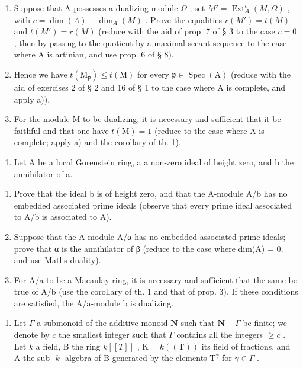 \begin{enumerate}
\def\labelenumi{\alph{enumi})}
\item
  Suppose that A possesses a dualizing module \(\Omega\) ; set \(M' = \operatorname{Ext}_A^c(M, \Omega)\) , with \(c = \dim(A) - \dim_A(M)\) . Prove the equalities \(r(M') = t(M)\) and \(t(M') = r(M)\) (reduce with the aid of prop. 7 of § 3 to the case \(c = 0\) , then by passing to the quotient by a maximal secant sequence to the case where A is artinian, and use prop. 6 of § 8).
\item
  Hence we have \(t(\mathrm{M}_{\mathfrak{p}}) \leqslant t(\mathrm{M})\) for every \(\mathfrak{p} \in \operatorname{Spec}(\mathrm{A})\) (reduce with the aid of exercises 2 of § 2 and 16 of § 1 to the case where A is complete, and apply a)).
\item
  For the module M to be dualizing, it is necessary and sufficient that it be faithful and that one have \(t(\mathrm{M}) = 1\) (reduce to the case where A is complete; apply a) and the corollary of th. 1).
\end{enumerate}

\begin{enumerate}
\def\labelenumi{\arabic{enumi})}
\setcounter{enumi}{7}
\tightlist
\item
  Let A be a local Gorenstein ring, a a non-zero ideal of height zero, and b the annihilator of a.
\end{enumerate}

\begin{enumerate}
\def\labelenumi{\alph{enumi})}
\item
  Prove that the ideal b is of height zero, and that the A-module A/b has no embedded associated prime ideals (observe that every prime ideal associated to A/b is associated to A).
\item
  Suppose that the A-module A/α has no embedded associated prime ideals; prove that α is the annihilator of β (reduce to the case where dim(A) = 0, and use Matlis duality).
\item
  For A/a to be a Macaulay ring, it is necessary and sufficient that the same be true of A/b (use the corollary of th. 1 and that of prop. 3). If these conditions are satisfied, the A/a-module b is dualizing.
\end{enumerate}

\begin{enumerate}
\def\labelenumi{\arabic{enumi})}
\setcounter{enumi}{8}
\tightlist
\item
  Let \(\Gamma\) a submonoid of the additive monoid \(\mathbf{N}\) such that \(\mathbf{N} - \Gamma\) be finite; we denote by \(c\) the smallest integer such that \(\Gamma\) contains all the integers \(\geqslant c\) . Let \(k\) a field, B the ring \(k[[T]]\) , \(\mathrm{K} = k((\mathrm{T}))\) its field of fractions, and A the sub- \(k\) -algebra of B generated by the elements \(\mathrm{T}^{\gamma}\) for \(\gamma \in \Gamma\) .
\end{enumerate}

